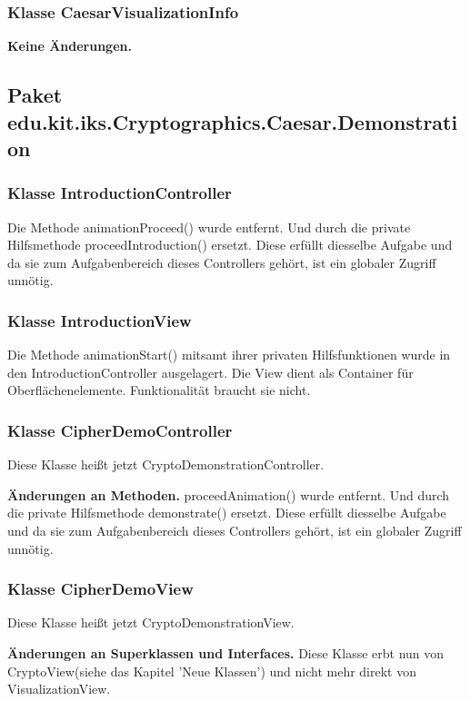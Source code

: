 \documentclass{article}
\begin{document}
  	\subsubsection{Klasse CaesarVisualizationInfo}
  	 \textbf{Keine Änderungen.}

 	\subsection{Paket edu.kit.iks.Cryptographics.Caesar.Demonstration}
          
          \subsubsection{Klasse IntroductionController}
            Die Methode animationProceed() wurde entfernt. Und durch die private Hilfsmethode proceedIntroduction() ersetzt.
            Diese erfüllt diesselbe Aufgabe und da sie zum Aufgabenbereich dieses Controllers gehört, ist ein globaler Zugriff
            unnötig.
       	  \subsubsection{Klasse IntroductionView}
            Die Methode animationStart() mitsamt ihrer privaten Hilfsfunktionen wurde in den IntroductionController ausgelagert.
            Die View dient als Container für Oberflächenelemente. Funktionalität braucht sie nicht.
	  \subsubsection{Klasse CipherDemoController}
            Diese Klasse heißt jetzt CryptoDemonstrationController.\newline
         
           \textbf{Änderungen an Methoden.}\newline
            proceedAnimation() wurde entfernt. Und durch die private Hilfsmethode demonstrate() ersetzt.
            Diese erfüllt diesselbe Aufgabe und da sie zum Aufgabenbereich dieses Controllers gehört, 
            ist ein globaler Zugriff unnötig.

	\subsubsection{Klasse CipherDemoView}
	   Diese Klasse heißt jetzt CryptoDemonstrationView.\newline
	   
	    \textbf{Änderungen an Superklassen und Interfaces.}\newline
	     Diese Klasse erbt nun von CryptoView(siehe das Kapitel 'Neue Klassen') und nicht mehr direkt von VisualizationView.\newline
	   
\end{document}
